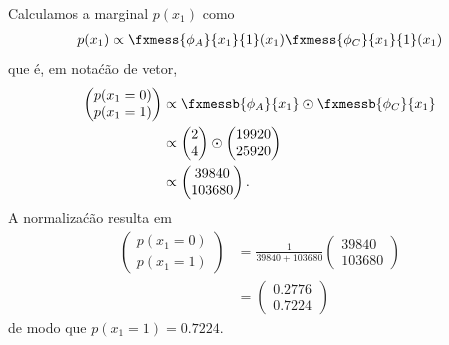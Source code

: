 \begin{exenumerate}
    \begin{solution}
        Calculamos a marginal $p(x_1)$ como
        \begin{align}
            p(x_1) \propto \fxmess{\phi_A}{x_1}{1}(x_1) \fxmess{\phi_C}{x_1}{1}(x_1)
        \end{align}
        que \'e, em nota\'c\~ao de vetor,
        \begin{align}
            \begin{pmatrix}
                p(x_1=0)\\
                p(x_1=1)
            \end{pmatrix}
            & \propto 
            \fxmessb{\phi_A}{x_1} \odot \fxmessb{\phi_C}{x_1}\\
            & \propto  
            \begin{pmatrix}
                2 \\
                4 \\
            \end{pmatrix}
            \odot
            \begin{pmatrix}
                19920\\
                25920
            \end{pmatrix}\\
            & \propto
            \begin{pmatrix}
                39840\\
                103680
            \end{pmatrix}.
        \end{align}
        A normaliza\'c\~ao resulta em
        \begin{align}
            \begin{pmatrix}
                p(x_1=0)\\
                p(x_1=1)
            \end{pmatrix}
            & =  \frac{1}{39840+103680}\begin{pmatrix}
                39840\\
                103680
            \end{pmatrix}\\
            & = \begin{pmatrix}
                0.2776\\
                0.7224
            \end{pmatrix}
        \end{align}
        de modo que $p(x_1=1) = 0.7224$.
        

\end{solution}
\end{exenumerate}
